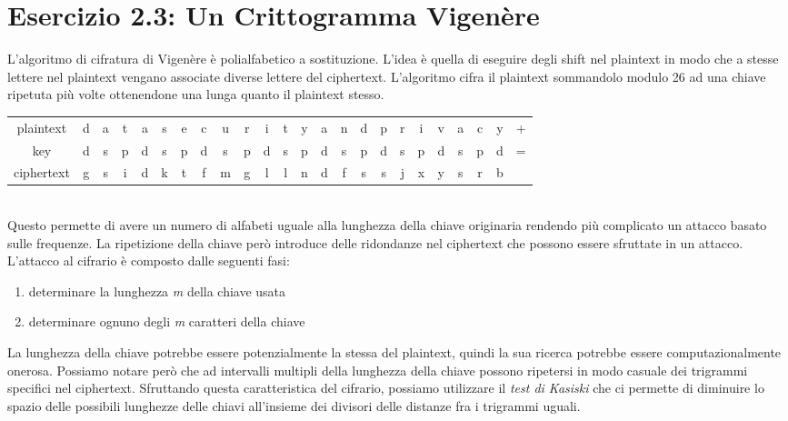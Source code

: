 \documentclass{article}
\begin{document}
\section*{Esercizio 2.3: Un Crittogramma Vigenère}
L'algoritmo di cifratura di Vigenère è polialfabetico a sostituzione. L'idea è quella di eseguire degli shift nel plaintext in modo che a stesse lettere nel plaintext vengano associate diverse lettere del ciphertext. L'algoritmo cifra il plaintext sommandolo modulo 26 ad una chiave ripetuta più volte ottenendone una lunga quanto il plaintext stesso.\\
\begin{table}[h]
    \centering
    \begin{adjustbox}{width=\columnwidth,center}
        \begin{tabular}{c c c c c c c c c c c c c c c c c c c c c c c c}
         plaintext&d&a&t&a&s&e&c&u&r&i&t&y&a&n&d&p&r&i&v&a&c&y&+\\
         key&d&s&p&d&s&p&d&s&p&d&s&p&d&s&p&d&s&p&d&s&p&d&=\\ \hline
         ciphertext&g&s&i&d&k&t&f&m&g&l&l&n&d&f&s&s&j&x&y&s&r&b&
        \end{tabular}
        \end{adjustbox}
    \label{tab:freq}
\end{table}\\
Questo permette di avere un numero di alfabeti uguale alla lunghezza della chiave originaria rendendo più complicato un attacco basato sulle frequenze. La ripetizione della chiave però introduce delle ridondanze nel ciphertext che possono essere sfruttate in un attacco. \\
L'attacco al cifrario è composto dalle seguenti fasi:
\begin{enumerate}
    \item determinare la lunghezza \textit{m} della chiave usata
    \item determinare ognuno degli \textit{m} caratteri della chiave 
\end{enumerate}
La lunghezza della chiave potrebbe essere potenzialmente la stessa del plaintext, quindi la sua ricerca potrebbe essere computazionalmente onerosa. Possiamo notare però che ad intervalli multipli della lunghezza della chiave possono ripetersi in modo casuale dei trigrammi specifici nel ciphertext. Sfruttando questa caratteristica del cifrario, possiamo utilizzare il \textit{test di Kasiski} che ci permette di diminuire lo spazio delle possibili lunghezze delle chiavi all'insieme dei divisori delle distanze fra i trigrammi uguali.
\end{document}
